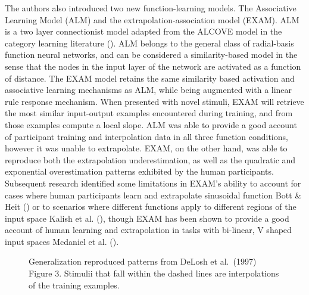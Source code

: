 \documentclass[
  letterpaper,
  DIV=11,
  numbers=noendperiod,
  oneside]{scrartcl}
\begin{document}
The authors also introduced two new function-learning models. The
Associative Learning Model (ALM) and the extrapolation-association model
(EXAM). ALM is a two layer connectionist model adapted from the ALCOVE
model in the category learning literature
(). ALM belongs to the general class of radial-basis function neural
networks, and can be considered a similarity-based model in the sense
that the nodes in the input layer of the network are activated as a
function of distance. The EXAM model retains the same similarity based
activation and associative learning mechanisms as ALM, while being
augmented with a linear rule response mechanism. When presented with
novel stimuli, EXAM will retrieve the most similar input-output examples
encountered during training, and from those examples compute a local
slope. ALM was able to provide a good account of participant training
and interpolation data in all three function conditions, however it was
unable to extrapolate. EXAM, on the other hand, was able to reproduce
both the extrapolation underestimation, as well as the quadratic and
exponential overestimation patterns exhibited by the human participants.
Subsequent research identified some limitations in EXAM's ability to
account for cases where human participants learn and extrapolate
sinusoidal function Bott \& Heit
() or to
scenarios where different functions apply to different regions of the
input space Kalish et al.
(), though EXAM
has been shown to provide a good account of human learning and
extrapolation in tasks with bi-linear, V shaped input spaces Mcdaniel et
al. ().

\begin{figure}


\caption{\label{fig-delosh-extrap}Generalization reproduced patterns
from DeLosh et al.~(1997) Figure 3. Stimulii that fall within the dashed
lines are interpolations of the training examples.}

\end{figure}%
\end{document}
